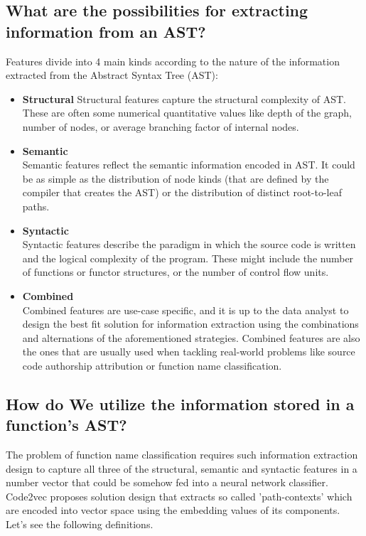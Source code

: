 \documentclass[10pt,english,a4paper]{report}
\begin{document}
\subsection{What are the possibilities for extracting information from an AST?}
Features divide into 4 main kinds according to the nature of the information extracted from the Abstract Syntax Tree (AST):
\begin{itemize}
    \item \textbf{Structural} \label{item:structural} 
    Structural features capture the structural complexity of AST. These are often some numerical quantitative values like depth of the graph, number of nodes, or average branching factor of internal nodes. 
    \item \textbf{Semantic} \\
    Semantic features reflect the semantic information encoded in AST. It could be as simple as the distribution of node kinds (that are defined by the compiler that creates the AST) or the distribution of distinct root-to-leaf paths. 
    \item \textbf{Syntactic} \\
    Syntactic features describe the paradigm in which the source code is written and the logical complexity of the program. These might include the number of functions or functor structures, or the number of control flow units.
    \item \textbf{Combined} \\
    Combined features are use-case specific, and it is up to the data analyst to design the best fit solution for information extraction using the combinations and alternations of the aforementioned strategies. Combined features are also the ones that are usually used when tackling real-world problems like source code authorship attribution or function name classification.   
\end{itemize}

\subsection{How do We utilize the information stored in a function's AST?}
The problem of function name classification requires such information extraction design to capture all three of the structural, semantic and syntactic features in a number vector that could be somehow fed into a neural network classifier. Code2vec \cite{code2vec} proposes solution design that extracts so called 'path-contexts' which are encoded into vector space using the embedding values of its components. Let's see the following definitions. 
\end{document}

